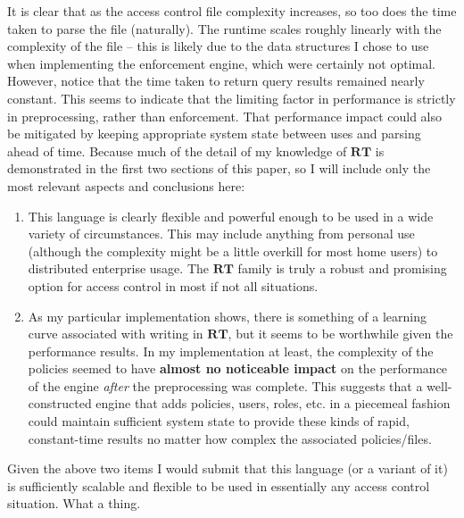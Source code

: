 \documentclass{article}
\providecommand{\RT}{\textbf{RT}}
\begin{document}
It is clear that as the access control file complexity increases, so too does the time taken to parse the file (naturally). The runtime scales roughly linearly with the complexity of the file -- this is likely due to the data structures I chose to use when implementing the enforcement engine, which were certainly not optimal. However, notice that the time taken to return query results remained nearly constant. This seems to indicate that the limiting factor in performance is strictly in preprocessing, rather than enforcement. That performance impact could also be mitigated by keeping appropriate system state between uses and parsing ahead of time.
Because much of the detail of my knowledge of $\RT$ is demonstrated in the first two sections of this paper, so I will include only the most relevant aspects and conclusions here:
\begin{enumerate}
  \item This language is clearly flexible and powerful enough to be used in a wide variety of circumstances. This may include anything from personal use (although the complexity might be a little overkill for most home users) to distributed enterprise usage. The $\RT$ family is truly a robust and promising option for access control in most if not all situations.
  \item As my particular implementation shows, there is something of a learning curve associated with writing in $\RT$, but it seems to be worthwhile given the performance results. In my implementation at least, the complexity of the policies seemed to have \textbf{almost no noticeable impact} on the performance of the engine \textit{after} the preprocessing was complete. This suggests that a well-constructed engine that adds policies, users, roles, etc. in a piecemeal fashion could maintain sufficient system state to provide these kinds of rapid, constant-time results no matter how complex the associated policies/files.
\end{enumerate}
Given the above two items I would submit that this language (or a variant of it) is sufficiently scalable and flexible to be used in essentially any access control situation. What a thing.

\bigskip


\printbibliography[heading=bibintoc]
\end{document}
